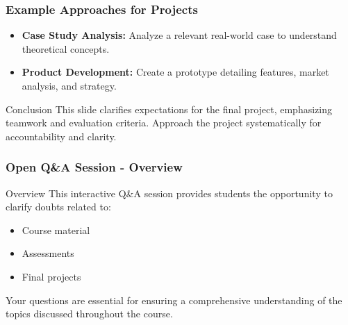 \documentclass[aspectratio=169]{beamer}
\begin{document}
\begin{frame}[fragile]
    \frametitle{Example Approaches for Projects}
    \begin{itemize}
        \item \textbf{Case Study Analysis:} Analyze a relevant real-world case to understand theoretical concepts.
        \item \textbf{Product Development:} Create a prototype detailing features, market analysis, and strategy.
    \end{itemize}

    \begin{block}{Conclusion}
        This slide clarifies expectations for the final project, emphasizing teamwork and evaluation criteria. Approach the project systematically for accountability and clarity.
    \end{block}
\end{frame}

\begin{frame}[fragile]
    \frametitle{Open Q\&A Session - Overview}
    \begin{block}{Overview}
        This interactive Q\&A session provides students the opportunity to clarify doubts related to:
        \begin{itemize}
            \item Course material
            \item Assessments
            \item Final projects
        \end{itemize}
        Your questions are essential for ensuring a comprehensive understanding of the topics discussed throughout the course.
    \end{block}
\end{frame}
\end{document}
